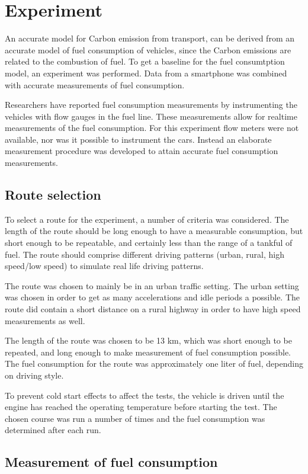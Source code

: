 \section{Experiment}
An accurate model for Carbon emission from transport, can be derived from an accurate model of fuel consumption of vehicles, since the Carbon emissions are related to the combustion of fuel. 
To get a baseline for the fuel consumtption model, an experiment was performed. Data from a smartphone was combined with accurate measurements of fuel consumption. 

Researchers have reported fuel consumption measurements by instrumenting the vehicles with flow gauges in the fuel line. These measurements allow for realtime measurements of the fuel consumption. For this experiment flow meters were not available, nor was it possible to instrument the cars. Instead an elaborate measurement procedure was developed to attain accurate fuel consumption measurements.

\subsection{Route selection}
To select a route for the experiment, a number of criteria was considered. The length of the route should be long enough to have a measurable consumption, but short enough to be repeatable, and certainly less than the range of a tankful of fuel. The route should comprise different driving patterns (urban, rural, high speed/low speed) to simulate real life driving patterns. 

The route was chosen to mainly be in an urban traffic setting. The urban setting was chosen in order to get as many accelerations and idle periods a possible. The route did contain a short distance on a rural highway in order to have high speed measurements as well.

The length of the route was chosen to be 13 km, which was short enough to be repeated, and long enough to make measurement of fuel consumption possible. The fuel consumption for the route was approximately one liter of fuel, depending on driving style.

To prevent cold start effects to affect the tests, the vehicle is driven until the engine has reached the operating temperature before starting the test. The chosen course was run a number of times and the fuel consumption was determined after each run.

\subsection{Measurement of fuel consumption}

